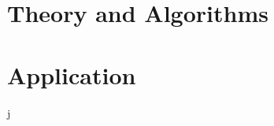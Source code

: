 \documentclass[10pt,oneside]{book}
\begin{document}
    \mainmatter
    \pagestyle{fancy}
    

    

    \part{Theory and Algorithms} \label{part:theory}
    
    

    
    

    
    
    

    \part{Application} \label{part:application}
    j
    

    \appendix
    

    \printbibliography
    
\end{document}
